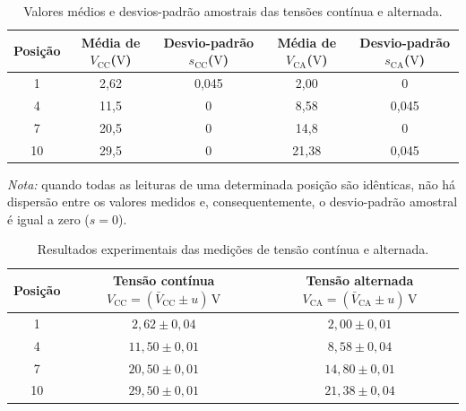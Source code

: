 \documentclass[a4paper,12pt]{article}
\begin{document}
\begin{table}[H]
    \centering
    \caption{Valores médios e desvios-padrão amostrais das tensões
    contínua e alternada.}
    \label{tab:medias_desvios_vcc_vca}
    \medskip

    \begin{tabular}{ccccc}
        \toprule
        \textbf{Posição}
        & \shortstack{\textbf{Média de}\\
          \boldmath$V_{\mathrm{CC}}$\unboldmath\\($\mathrm{V}$)}
        & \shortstack{\textbf{Desvio-padrão}\\
          \boldmath$s_{\mathrm{CC}}$\unboldmath\\($\mathrm{V}$)}
        & \shortstack{\textbf{Média de}\\
          \boldmath$V_{\mathrm{CA}}$\unboldmath\\($\mathrm{V}$)}
        & \shortstack{\textbf{Desvio-padrão}\\
          \boldmath$s_{\mathrm{CA}}$\unboldmath\\($\mathrm{V}$)}
        \\
        \midrule
        1  & 2,62 & 0,045 & 2,00  & 0     \\
        4  & 11,5 & 0     & 8,58  & 0,045 \\
        7  & 20,5 & 0     & 14,8  & 0     \\
        10 & 29,5 & 0     & 21,38 & 0,045 \\
        \bottomrule
    \end{tabular}
\end{table}

\noindent
\textit{Nota:} quando todas as leituras de uma determinada posição são
idênticas, não há dispersão entre os valores medidos e, consequentemente,
o desvio-padrão amostral é igual a zero (\(s=0\)).

\begin{table}[H]
    \centering
    \caption{Resultados experimentais das medições de tensão contínua
    e alternada.}
    \label{tab:resultados_tensoes}
    \medskip

    \begin{tabular}{ccc}
        \toprule
        \textbf{Posição}
        & \shortstack{\textbf{Tensão contínua}\\
          \(V_{\mathrm{CC}}=(\bar V_{\mathrm{CC}}\pm u)\,\mathrm{V}\)}
        & \shortstack{\textbf{Tensão alternada}\\
          \(V_{\mathrm{CA}}=(\bar V_{\mathrm{CA}}\pm u)\,\mathrm{V}\)}
        \\
        \midrule
        1  & \(2{,}62\pm0{,}04\)  & \(2{,}00\pm0{,}01\)  \\
        4  & \(11{,}50\pm0{,}01\) & \(8{,}58\pm0{,}04\)  \\
        7  & \(20{,}50\pm0{,}01\) & \(14{,}80\pm0{,}01\) \\
        10 & \(29{,}50\pm0{,}01\) & \(21{,}38\pm0{,}04\) \\
        \bottomrule
    \end{tabular}
\end{table}
\end{document}
